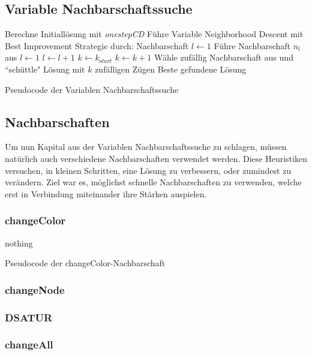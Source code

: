 
\subsection{Variable Nachbarschaftssuche}

\begin{algorithm}
\begin{algorithmic}[1]
\State Berechne Initiallösung mit \emph{onestepCD}
\State Führe Variable Neighborhood Descent mit Best Improvement Strategie durch:
\State Nachbarschaft $l \leftarrow 1$
\State Führe Nachbarschaft $n_l$ aus
\State  $l\leftarrow 1$  
\Else
\State  $l\leftarrow l + 1$
\EndIf
\EndWhile
{}
\State $k \leftarrow k_{\mathrm start}$ 
\Else
\State $k \leftarrow k + 1$
\EndIf
\State Wähle zufällig Nachbarschaft aus und ``schüttle" Lösung mit $k$ zufälligen Zügen
\EndWhile
\State\Return Beste gefundene Lösung
\end{algorithmic}
\caption{Pseudocode der Variablen Nachbarschaftssuche}
\end{algorithm}


\subsection{Nachbarschaften}
Um nun Kapital aus der Variablen Nachbarschaftssuche zu schlagen, müssen natürlich auch verschiedene Nachbarschaften verwendet werden. Diese 
Heuristiken versuchen, in kleinen Schritten, eine Lösung zu verbessern, oder zumindest zu verändern. Ziel war es, möglichst schnelle Nachbarschaften
zu verwenden, welche erst in Verbindung miteinander ihre Stärken auspielen. 

\subsubsection{changeColor}
\begin{algorithm}
\begin{algorithmic}
\State nothing
\end{algorithmic}
\caption{Pseudocode der changeColor-Nachbarschaft}
\label{psy:changeColor}
\end{algorithm}
\subsubsection{changeNode}
\subsubsection{DSATUR}
\subsubsection{changeAll}


 
